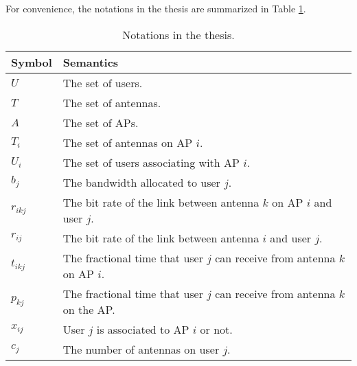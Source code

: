 	For convenience, the notations in the thesis are summarized in Table \ref{Tab:notation}.
	
	\begin{table} \small
		\centering \caption{Notations in the thesis.}
		\renewcommand\arraystretch{1.0}
		\begin{tabular}{|l|l|} %
			\hline	Symbol & Semantics \\
			\hline	$U$ & The set of users. \\
			\hline	$T$ & The set of antennas. \\
			\hline	$A$ & The set of APs. \\
			\hline	$T_i$ & The set of antennas on AP $i$. \\
			\hline	$U_i$ & The set of users associating with AP $i$. \\
			\hline	$b_j$ & The bandwidth allocated to user $j$. \\
			\hline	$r_{ikj}$ & The bit rate of the link between antenna $k$ on AP $i$ and user $j$. \\
			\hline	$r_{ij}$ & The bit rate of the link between antenna $i$ and user $j$. \\
			\hline	$t_{ikj}$ & The fractional time that user $j$ can receive from antenna $k$ on AP $i$. \\
			\hline	$p_{kj}$ & The fractional time that user $j$ can receive from antenna $k$ on the AP. \\
			\hline	$x_{ij}$ & User $j$ is associated to AP $i$ or not. \\
			\hline	$c_{j}$ & The number of antennas on user $j$. \\
			\hline
		\end{tabular}\label{Tab:notation}
	\end{table}
